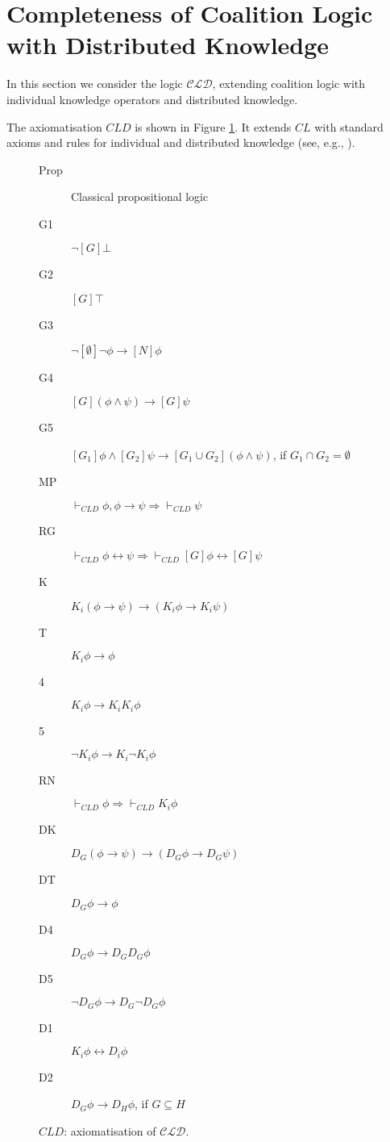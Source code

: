 \documentclass{article}
\newcommand{\acro}[1]{\ensuremath{\mathcal{#1}}}
\begin{document}
\section{Completeness of Coalition Logic with Distributed Knowledge}
\label{sec:cld}

In this section we consider the logic \acro{CLD}, extending coalition
logic with individual knowledge operators and distributed knowledge.

The axiomatisation $CLD$ is shown in Figure \ref{fig:cld-ax}. It extends
$CL$ with standard axioms and rules for individual and distributed
knowledge (see, e.g., \cite{Fagin1995}).

\begin{figure}[h]
  \centering
\begin{description}
\item[Prop] Classical propositional logic
\item[G1] $\neg [G] \bot$
\item[G2] $[G] \top$
\item[G3] $\neg [\emptyset] \neg \phi \rightarrow [N] \phi$
\item[G4] $[G] (\phi \wedge \psi) \rightarrow [G] \psi$
\item[G5] $[G_1]\phi \wedge [G_2]\psi \rightarrow [G_1 \cup G_2] (\phi \wedge \psi)$, if $G_1 \cap G_2 = \emptyset$
\item[MP] $\vdash_{CLD} \phi, \phi \rightarrow \psi \Rightarrow \vdash_{CLD}  \psi$
\item[RG] $\vdash_{CLD} \phi \leftrightarrow \psi \Rightarrow \vdash_{CLD} [G] \phi \leftrightarrow [G] \psi $
\item[K] $K_i (\phi \rightarrow \psi) \rightarrow (K_i \phi \rightarrow K_i \psi)$
\item[T] $K_i \phi \rightarrow \phi$
\item[4] $K_i \phi \rightarrow K_i K_i \phi$
\item[5] $\neg K_i \phi \rightarrow K_i \neg K_i \phi$
\item[RN] $\vdash_{CLD} \phi \Rightarrow \vdash_{CLD} K_i \phi$
\item[DK] $D_G (\phi \rightarrow \psi) \rightarrow (D_G \phi \rightarrow D_G \psi)$
\item[DT] $D_G \phi \rightarrow \phi$
\item[D4] $D_G \phi \rightarrow D_G D_G \phi$
\item[D5] $\neg D_G \phi \rightarrow D_G \neg D_G \phi$
\item[D1] $K_i \phi \leftrightarrow D_i \phi$
\item[D2] $D_G \phi \rightarrow D_H\phi$, if $G \subseteq H$
\end{description}
  \caption{$CLD$: axiomatisation of \acro{CLD}.}
  \label{fig:cld-ax}
\end{figure}
\end{document}
